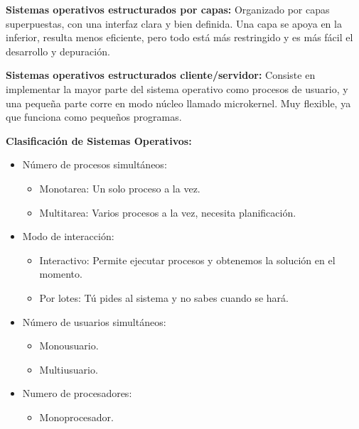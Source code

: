 \documentclass[12pt, twoside, openright]{report} %
\begin{document}
  
  \textbf{Sistemas operativos estructurados por capas:} Organizado por
  capas superpuestas, con una interfaz clara y bien definida. Una capa
  se apoya en la inferior, resulta menos eficiente, pero todo está más
  restringido y es más fácil el desarrollo y depuración.
  
  
  \textbf{Sistemas operativos estructurados cliente/servidor:} Consiste
  en implementar la mayor parte del sistema operativo como procesos de
  usuario, y una pequeña parte corre en modo núcleo llamado microkernel.
  Muy flexible, ya que funciona como pequeños programas.
  
  
  \textbf{Clasificación de Sistemas Operativos:}
  \vspace{-0.5cm}

  \begin{itemize}
  \item Número de procesos simultáneos:
    

    \begin{itemize}
    \item Monotarea: Un solo proceso a la vez.
      
    \item Multitarea: Varios procesos a la vez, necesita planificación.
      
    \end{itemize}
  \item Modo de interacción:
    

    \begin{itemize}
    \item Interactivo: Permite ejecutar procesos y obtenemos la solución en
      el momento.
      
    \item Por lotes: Tú pides al sistema y no sabes cuando se hará.
      
    \end{itemize}
  \item Número de usuarios simultáneos:
    

    \begin{itemize}
    \item Monousuario.
      
    \item Multiusuario.
      
    \end{itemize}
  \item Numero de procesadores:
    

    \begin{itemize}
    \item Monoprocesador.
      

\end{itemize}
\end{itemize}
\end{document}
